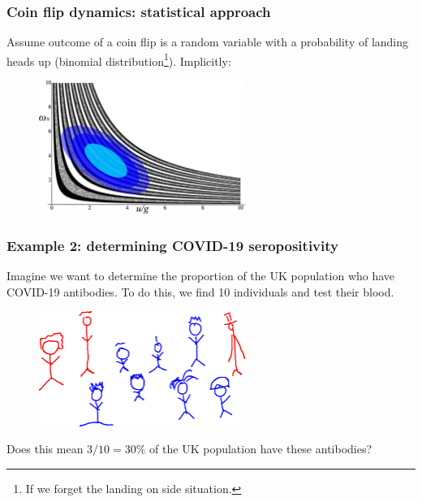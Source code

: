 \documentclass[handout]{beamer}
\begin{document}
\begin{frame}
	\frametitle{Coin flip dynamics: statistical approach}
	
	Assume outcome of a coin flip is a random variable with a probability of landing heads up (binomial distribution\footnote{If we forget the landing on side situation.}). Implicitly:
	
	\begin{figure}[ht]
		\centerline{\includegraphics[width=0.6\textwidth]{../figures/coin_toss_density.pdf}}
	\end{figure}
	
\end{frame}

\begin{frame}
	\frametitle{Example 2: determining COVID-19 seropositivity}
	Imagine we want to determine the proportion of the UK population who have COVID-19 antibodies. To do this, we find 10 individuals and test their blood.
	
	\begin{figure}[ht]
		\centerline{\includegraphics[width=0.6\textwidth]{../figures/covid_stick.pdf}}
	\end{figure}
	
	Does this mean $3/10=30\%$ of the UK population have these antibodies?
	
\end{frame}
\end{document}
